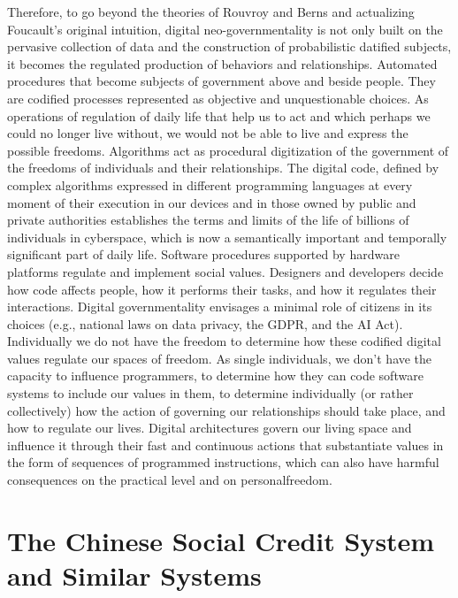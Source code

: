 Therefore, to go beyond the theories of Rouvroy and Berns and actualizing Foucault's original intuition, digital neo-governmentality is not only built on the pervasive collection of data and the construction of probabilistic datified subjects, it becomes the regulated production of behaviors and relationships. Automated procedures that become subjects of government above and beside people. They are codified processes represented as objective and unquestionable choices. As operations of regulation of daily life that help us to act and which perhaps we could no longer live without, we would not be able to live and express the possible freedoms. Algorithms act as procedural digitization of the government of the freedoms of individuals and their relationships. The digital code, defined by complex algorithms expressed in different programming languages at every moment of their execution in our devices and in those owned by public and private authorities establishes the terms and limits of the life of billions of individuals in cyberspace, which is now a semantically important and temporally significant part of daily life. Software procedures supported by hardware platforms regulate and implement social values. Designers and developers decide how code affects people, how it performs their tasks, and how it regulates their interactions. Digital governmentality envisages a minimal role of citizens in its choices (e.g., national laws on data privacy, the GDPR, and the AI Act). Individually we do not have the freedom to determine how these codified digital values regulate our spaces of freedom. As single individuals, we don't have the capacity to influence programmers, to determine how they can code software systems to include our values in them, to determine individually (or rather collectively) how the action of governing our relationships should take place, and how to regulate our lives. Digital architectures govern our living space and influence it through their fast and continuous actions that substantiate values in the form of sequences of programmed instructions, which can also have harmful consequences on the practical level and on personal\break freedom.

\section{\label{sec:9.5}The Chinese Social Credit System and Similar Systems}

